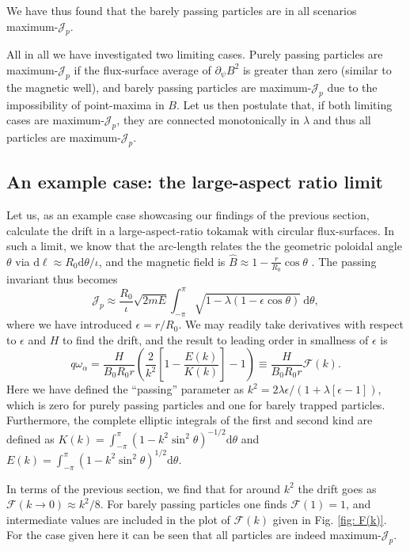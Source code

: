 We have thus found that the barely passing particles are in all scenarios maximum-$\mathcal{J}_p$. \par 
All in all we have investigated two limiting cases. Purely passing particles are maximum-$\mathcal{J}_p$ if the flux-surface average of $\partial_\psi B^2$ is greater than zero (similar to the magnetic well), and barely passing particles are maximum-$\mathcal{J}_p$ due to the impossibility of point-maxima in $B$. Let us then postulate that, if both limiting cases are maximum-$\mathcal{J}_p$, they are connected monotonically in $\lambda$ and thus all particles are maximum-$\mathcal{J}_p$.

\subsection*{An example case: the large-aspect ratio limit}
Let us, as an example case showcasing our findings of the previous section, calculate the drift in a large-aspect-ratio tokamak with circular flux-surfaces. In such a limit, we know that the arc-length relates the the geometric poloidal angle $\theta$ via $\mathrm{d}\ell \approx R_0 \mathrm{d} \theta / \iota$, and the magnetic field is $\hat{B} \approx 1 - \frac{r}{R_0} \cos \theta$ \cite{helander2005collisional}. The passing invariant thus becomes
\begin{equation}
    \mathcal{J}_p \approx \frac{R_0}{\iota} \sqrt{2mE} \int_{-\pi}^{\pi} \sqrt{1 - \lambda (1 - \epsilon\cos \theta)} \: \mathrm{d} \theta,
\end{equation}
where we have introduced $\epsilon = r/R_0$. We may readily take derivatives with respect to $\epsilon$ and $H$ to find the drift, and the result to leading order in smallness of $\epsilon$ is
\begin{equation}
    q \omega_\alpha = \frac{H}{B_0 R_0 r} \left(\frac{2}{k^2} \left[1 - \frac{E(k)}{K(k)} \right] - 1 \right) \equiv \frac{H}{B_0 R_0 r} \mathcal{F}(k).
\end{equation}
Here we have defined the ``passing'' parameter as $k^2 = 2 \lambda \epsilon / ( 1 + \lambda [ \epsilon - 1 ] )$, which is zero for purely passing particles and one for barely trapped particles. Furthermore, the complete elliptic integrals of the first and second kind are defined as $K(k) = \int_{-\pi}^{\pi} (1 - k^2 \sin^2 \theta)^{-1/2} \mathrm{d} \theta$ and $E(k) = \int_{-\pi}^{\pi} (1 - k^2 \sin^2 \theta)^{1/2} \mathrm{d} \theta$. \par 
In terms of the previous section, we find that for around $k^2$ the drift goes as $\mathcal{F}(k \rightarrow 0) \approx k^2 / 8$. For barely passing particles one finds $\mathcal{F}(1) = 1$, and intermediate values are included in the plot of $\mathcal{F}(k)$ given in Fig. \ref{fig: F(k)}. For the case given here it can be seen that all particles are indeed maximum-$\mathcal{J}_p$.
